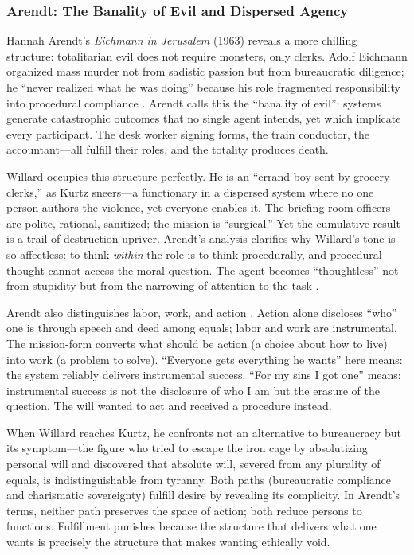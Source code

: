 \subsubsection*{Arendt: The Banality of Evil and Dispersed Agency}
Hannah Arendt's \textit{Eichmann in Jerusalem} (1963) reveals a more chilling structure:
totalitarian evil does not require monsters, only clerks. Adolf Eichmann organized mass murder
not from sadistic passion but from bureaucratic diligence; he ``never realized what he was
doing'' because his role fragmented responsibility into procedural compliance
\parencite{ArendtEichmann1963}. Arendt calls this the ``banality of evil'': systems generate
catastrophic outcomes that no single agent intends, yet which implicate every participant. The
desk worker signing forms, the train conductor, the accountant---all fulfill their roles, and
the totality produces death.

Willard occupies this structure perfectly. He is an ``errand boy sent by grocery clerks,'' as
Kurtz sneers---a functionary in a dispersed system where no one person authors the violence,
yet everyone enables it. The briefing room officers are polite, rational, sanitized; the
mission is ``surgical.'' Yet the cumulative result is a trail of destruction upriver. Arendt's
analysis clarifies why Willard's tone is so affectless: to think \emph{within} the role is to
think procedurally, and procedural thought cannot access the moral question. The agent becomes
``thoughtless'' not from stupidity but from the narrowing of attention to the task
\parencite{ArendtEichmann1963}.

Arendt also distinguishes labor, work, and action \parencite{ArendtHC1958}. Action alone
discloses ``who'' one is through speech and deed among equals; labor and work are instrumental.
The mission-form converts what should be action (a choice about how to live) into work (a
problem to solve). ``Everyone gets everything he wants'' here means: the system reliably
delivers instrumental success. ``For my sins I got one'' means: instrumental success is not the
disclosure of who I am but the erasure of the question. The will wanted to act and received a
procedure instead.

When Willard reaches Kurtz, he confronts not an alternative to bureaucracy but its
symptom---the figure who tried to escape the iron cage by absolutizing personal will and
discovered that absolute will, severed from any plurality of equals, is indistinguishable from
tyranny. Both paths (bureaucratic compliance and charismatic sovereignty) fulfill desire by
revealing its complicity. In Arendt's terms, neither path preserves the space of action; both
reduce persons to functions. Fulfillment punishes because the structure that delivers what one
wants is precisely the structure that makes wanting ethically void.

